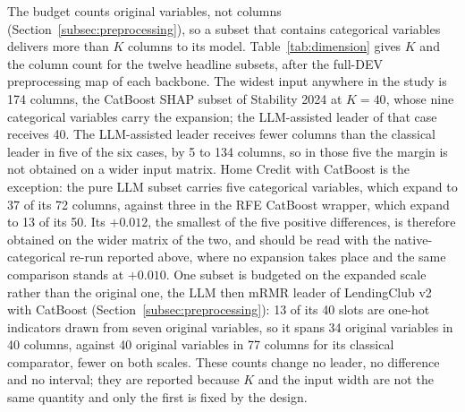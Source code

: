 \documentclass[final,5p,twocolumn]{elsarticle}
\newcommand{\Kfeat}{K}
\begin{document}
The budget counts original variables, not columns (Section~\ref{subsec:preprocessing}), so a subset that contains categorical variables delivers more than $\Kfeat$ columns to its model. Table~\ref{tab:dimension} gives $\Kfeat$ and the column count for the twelve headline subsets, after the full-DEV preprocessing map of each backbone. The widest input anywhere in the study is 174 columns, the CatBoost SHAP subset of Stability 2024 at $\Kfeat=40$, whose nine categorical variables carry the expansion; the LLM-assisted leader of that case receives 40. The LLM-assisted leader receives fewer columns than the classical leader in five of the six cases, by 5 to 134 columns, so in those five the margin is not obtained on a wider input matrix. Home Credit with CatBoost is the exception: the pure LLM subset carries five categorical variables, which expand to 37 of its 72 columns, against three in the RFE CatBoost wrapper, which expand to 13 of its 50. Its $+0.012$, the smallest of the five positive differences, is therefore obtained on the wider matrix of the two, and should be read with the native-categorical re-run reported above, where no expansion takes place and the same comparison stands at $+0.010$. One subset is budgeted on the expanded scale rather than the original one, the LLM then mRMR leader of LendingClub v2 with CatBoost (Section~\ref{subsec:preprocessing}): 13 of its 40 slots are one-hot indicators drawn from seven original variables, so it spans 34 original variables in 40 columns, against 40 original variables in 77 columns for its classical comparator, fewer on both scales. These counts change no leader, no difference and no interval; they are reported because $\Kfeat$ and the input width are not the same quantity and only the first is fixed by the design.
\end{document}
